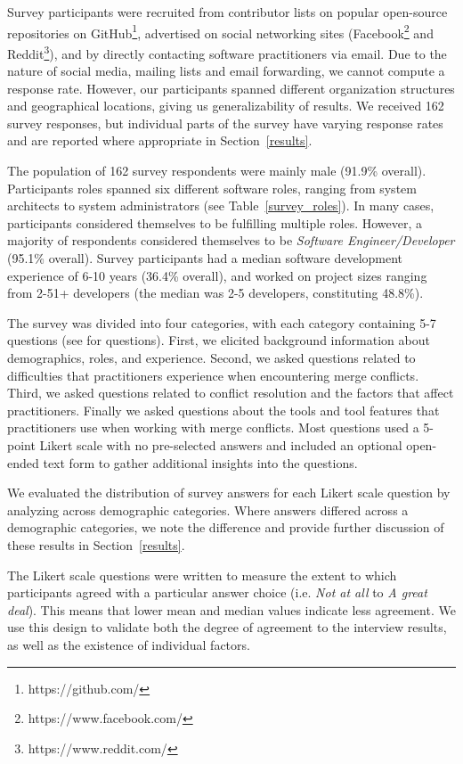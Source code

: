 \renewcommand*{\thefootnote}{\arabic{footnote}}
\setcounter{footnote}{0}
Survey participants were recruited from contributor lists on popular open-source repositories on GitHub\footnote{https://github.com/}, advertised on social networking sites (Facebook\footnote{https://www.facebook.com/} and Reddit\footnote{https://www.reddit.com/}), and by directly contacting software practitioners via email. Due to the nature of social media, mailing lists and email forwarding, we cannot compute a response rate. However, our participants spanned different organization structures and geographical locations, giving us generalizability of results.
We received 162 survey responses, but individual parts of the survey have varying response rates and are reported where appropriate in Section~\ref{results}.

The population of 162 survey respondents were mainly male (91.9\% overall).  Participants roles spanned six different software roles, ranging from system architects to system administrators (see Table~\ref{survey_roles}). In many cases, participants considered themselves to be fulfilling multiple roles. However, a majority of respondents considered themselves to be \textit{Software Engineer/Developer} (95.1\% overall).
Survey participants had a median software development experience of 6-10 years (36.4\% overall), and worked on project sizes ranging from 2-51+ developers (the median was 2-5 developers, constituting 48.8\%).

The survey was divided into four categories, with each category containing 5-7 questions (see \cite{companion_site} for questions).
First, we elicited background information about demographics, roles, and experience.
Second, we asked questions related to difficulties that practitioners experience when encountering merge conflicts.
Third, we asked questions related to conflict resolution and the factors that affect practitioners.
Finally we asked questions about the tools and tool features that practitioners use when working with merge conflicts.
Most questions used a 5-point Likert scale with no pre-selected answers and included an optional open-ended text form to gather additional insights into the questions. 

 We evaluated the distribution of survey answers for each Likert scale question by analyzing across demographic categories.
Where answers differed across a demographic categories, we note the difference and provide further discussion of these results in Section~\ref{results}.

The Likert scale questions were written to measure the extent to which participants agreed with a particular answer choice (i.e. \textit{Not at all} to \textit{A great deal}). This means that lower mean and median values indicate less agreement.
We use this design to validate both the degree of agreement to the interview results, as well as the existence of individual factors.
